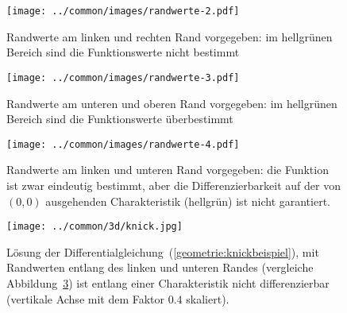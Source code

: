 \begin{figure}
\begin{center}
\texttt{[image: ../common/images/randwerte-2.pdf]}
\end{center}
\caption{Randwerte am linken und rechten Rand vorgegeben: im hellgrünen
Bereich sind die Funktionswerte nicht bestimmt \label{geometrie:charrand1}}
\end{figure}

\begin{figure}
\begin{center}
\texttt{[image: ../common/images/randwerte-3.pdf]}
\end{center}
\caption{Randwerte am unteren und oberen Rand vorgegeben: im hellgrünen
Bereich sind die Funktionswerte überbestimmt \label{geometrie:charrand2}}
\end{figure}

\begin{figure}
\begin{center}
\texttt{[image: ../common/images/randwerte-4.pdf]}
\end{center}
\caption{Randwerte am linken und unteren Rand vorgegeben: die Funktion
ist zwar eindeutig bestimmt, aber die Differenzierbarkeit auf
der von $(0,0)$ ausgehenden Charakteristik (hellgrün) ist nicht garantiert.
\label{geometrie:charrand3}}
\end{figure}

\begin{figure}
\centering
\texttt{[image: ../common/3d/knick.jpg]}
\caption{Lösung der Differentialgleichung~(\ref{geometrie:knickbeispiel}),
mit Randwerten entlang des linken und unteren Randes (vergleiche
Abbildung~\ref{geometrie:charrand3}) ist entlang einer Charakteristik
nicht differenzierbar (vertikale Achse mit dem Faktor $0.4$ skaliert).
\label{geometrie:knick}}
\end{figure}

